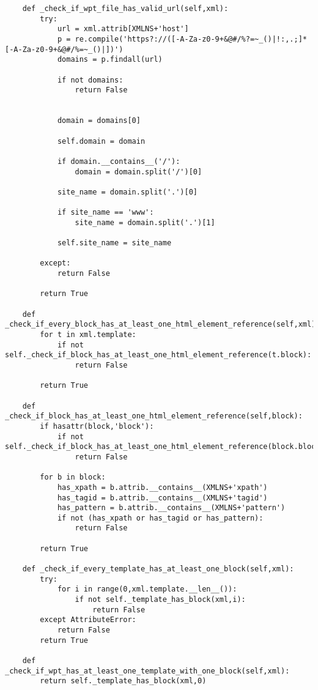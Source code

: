 \begin{lstlisting}
    def _check_if_wpt_file_has_valid_url(self,xml):
        try:
            url = xml.attrib[XMLNS+'host']
            p = re.compile('https?://([-A-Za-z0-9+&@#/%?=~_()|!:,.;]*[-A-Za-z0-9+&@#/%=~_()|])')
            domains = p.findall(url)
            
            if not domains: 
                return False
    
     
            domain = domains[0]

            self.domain = domain 

            if domain.__contains__('/'):
                domain = domain.split('/')[0]
     
            site_name = domain.split('.')[0]
     
            if site_name == 'www':
                site_name = domain.split('.')[1]

            self.site_name = site_name

        except:
            return False
    
        return True

    def _check_if_every_block_has_at_least_one_html_element_reference(self,xml):
        for t in xml.template:
            if not self._check_if_block_has_at_least_one_html_element_reference(t.block):
                return False

        return True
   
    def _check_if_block_has_at_least_one_html_element_reference(self,block):
        if hasattr(block,'block'): 
            if not self._check_if_block_has_at_least_one_html_element_reference(block.block):
                return False

        for b in block:
            has_xpath = b.attrib.__contains__(XMLNS+'xpath')
            has_tagid = b.attrib.__contains__(XMLNS+'tagid')
            has_pattern = b.attrib.__contains__(XMLNS+'pattern')
            if not (has_xpath or has_tagid or has_pattern):
                return False

        return True
 
    def _check_if_every_template_has_at_least_one_block(self,xml):
        try:
            for i in range(0,xml.template.__len__()):
                if not self._template_has_block(xml,i):
                    return False
        except AttributeError:
            return False
        return True

    def _check_if_wpt_has_at_least_one_template_with_one_block(self,xml):
        return self._template_has_block(xml,0)


\end{lstlisting}
